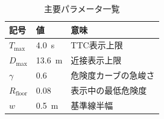 \begin{table}[htbp]
  \centering
  \caption{主要パラメータ一覧}
  \label{tab:params}
  \begin{tabular}{lll}
    \toprule
    記号 & 値 & 意味 \\
    \midrule
    $T_\text{max}$ & \SI{4.0}{s} & TTC表示上限 \\
    $D_\text{max}$ & \SI{13.6}{m} & 近接表示上限 \\
    $\gamma$ & 0.6 & 危険度カーブの急峻さ \\
    $R_\text{floor}$ & 0.08 & 表示中の最低危険度 \\
    $w$ & \SI{0.5}{m} & 基準線半幅 \\
    \bottomrule
  \end{tabular}
\end{table}
